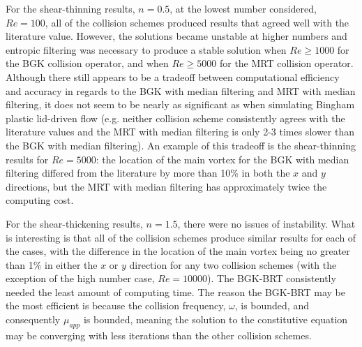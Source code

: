 For the shear-thinning results, $n = 0.5$, at the lowest \DIFdelbegin {}\DIFdelend \DIFaddbegin {}\DIFaddend number considered, $Re = 100$, all of the collision schemes produced results that agreed well with the literature value.
However, the solutions became unstable at higher \DIFdelbegin {}\DIFdelend \DIFaddbegin {}\DIFaddend numbers and entropic filtering was necessary to produce a stable solution when $Re \ge 1000$ for the BGK collision operator, and when $Re \ge 5000$ for the MRT collision operator.
Although there still appears to be a tradeoff between computational efficiency and accuracy in regards to the BGK with median filtering and MRT with median filtering, it does not seem to be nearly as significant as when simulating Bingham plastic lid-driven flow (e.g. neither collision scheme consistently agrees with the literature values and the MRT with median filtering is only 2-3 times slower than the BGK with median filtering).
An example of this tradeoff is the shear-thinning results for $Re = 5000$: the location of the main vortex for the BGK with median filtering differed from the literature by more than 10\% in both the $x$ and $y$ directions, but the MRT with median filtering has approximately twice the computing cost.

For the shear-thickening results, $n = 1.5$, there were no issues of instability.
What is interesting is that all of the collision schemes produce similar results for each of the cases, with the difference in the location of the main vortex being no greater than 1\% in either the $x$ or $y$ direction for any two collision schemes (with the exception of the high \DIFdelbegin {}\DIFdelend \DIFaddbegin {}\DIFaddend number case, $Re = 10000$).
The BGK-BRT consistently needed the least amount of computing time.
The reason the BGK-BRT may be the most efficient is because the collision frequency, $\omega$, is bounded, and consequently $\mu_{app}$ is bounded, meaning the solution to the constitutive equation may be converging with less iterations than the other collision schemes.

